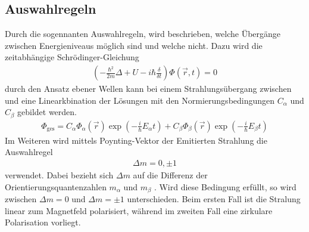 \subsection{Auswahlregeln}
\label{sec:Auswahlregeln}
Durch die sogennanten Auswahlregeln, wird beschrieben, welche Übergänge zwischen
Energieniveaus möglich sind und welche nicht. Dazu wird die zeitabhängige
Schrödinger-Gleichung
\begin{align}
  \left( -\frac{\hbar^2}{2m}\Delta+U-i\hbar \frac{\delta}{\delta t} \right)\Phi\left(\vec{r}, t \right) = 0
  \label{eqn:schroedinger}
\end{align}
durch den Ansatz ebener Wellen kann bei einem Strahlungsübergang zwischen \alpha
und \beta eine Linearkbination der Lösungen mit den Normierungsbedingungen $C_\alpha$
und $C_\beta$ gebildet werden.
\begin{align}
  \Phi_\text{ges} = C_\alpha \Phi_\alpha\left(\vec{r}\right)\exp{\left(-\frac{i}{\hbar}E_\alpha t\right)} + C_\beta \Phi_\beta\left(\vec{r}\right)\exp{\left(-\frac{i}{\hbar}E_\beta t\right)}
  \label{eqn:ebenewelle}
\end{align}
Im Weiteren wird mittels Poynting-Vektor der Emitierten Strahlung die Auswahlregel
\begin{align}
  \Delta m = 0, \pm 1
  \label{eqn:auswahl}
\end{align}
verwendet. Dabei bezieht sich $\Delta m$ auf die Differenz der Orientierungsquantenzahlen
$m_\alpha$ und $m_\beta$ . Wird diese Bedingung erfüllt, so wird zwischen $\Delta m = 0$
und $\Delta m = \pm 1$ unterschieden. Beim ersten Fall ist die Stralung linear zum
Magnetfeld polarisiert, während im zweiten Fall eine zirkulare Polarisation vorliegt.



